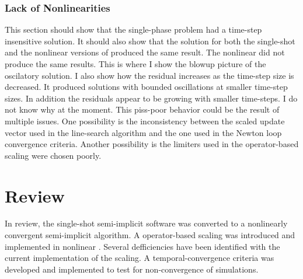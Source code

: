 \subsubsection{Lack of Nonlinearities}
\label{sect:result_linear_problem}


This section should show that the single-phase problem had a time-step insensitive solution.
It should also show that the solution for both the single-shot and the nonlinear versions of \cobra produced the same result.
The nonlinear \cobra did not produce the same results.
This is where I show the blowup picture of the oscilatory solution.
I also show how the residual increases as the time-step size is decreased.
It produced solutions with bounded oscillations at smaller time-step sizes.
In addition the residuals appear to be growing with smaller time-steps.
I do not know why at the moment.
This piss-poor behavior could be the result of multiple issues.
One possibility is the inconsistency between the scaled update vector used in the line-search algorithm and  the one used in the Newton loop convergence criteria.
Another possibility is the limiters used in the operator-based scaling were chosen poorly.

\section{Review}
\label{sect:review}

In review, the single-shot semi-implicit \cobra software was converted to a nonlinearly convergent semi-implicit algorithm.
A operator-based scaling was introduced and implemented in nonlinear \cobra.
Several defficiencies have been identified with the current implementation of the scaling.
A temporal-convergence criteria was developed and implemented to test for non-convergence of simulations. 


